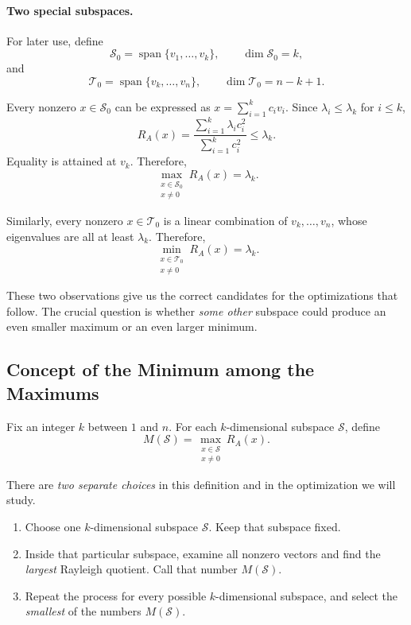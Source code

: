 \documentclass[14pt,letterpaper]{article}
\theoremstyle{plain}
\theoremstyle{definition}
\theoremstyle{remark}
\DeclareMathOperator{\Span}{span}
\begin{document}
\paragraph{Two special subspaces.}
For later use, define
\[
\mathcal S_0=\Span\{v_1,\ldots,v_k\},
\qquad \dim\mathcal S_0=k,
\]
and
\[
\mathcal T_0=\Span\{v_k,\ldots,v_n\},
\qquad \dim\mathcal T_0=n-k+1.
\]

Every nonzero $x\in\mathcal S_0$ can be expressed as
$x=\sum_{i=1}^k c_i v_i$. Since $\lambda_i\leq\lambda_k$
for $i\leq k$,
\[
R_A(x)=\frac{\sum_{i=1}^k\lambda_i c_i^2}
             {\sum_{i=1}^k c_i^2}
\leq\lambda_k.
\]
Equality is attained at $v_k$. Therefore,
\[
\boxed{
\max_{\substack{x\in\mathcal S_0\\x\neq0}}R_A(x)
=\lambda_k.
}
\]

Similarly, every nonzero $x\in\mathcal T_0$ is a
linear combination of $v_k,\ldots,v_n$, whose
eigenvalues are all at least $\lambda_k$. Therefore,
\[
\boxed{
\min_{\substack{x\in\mathcal T_0\\x\neq0}}R_A(x)
=\lambda_k.
}
\]

These two observations give us the correct candidates
for the optimizations that follow. The crucial question
is whether \emph{some other} subspace could produce an
even smaller maximum or an even larger minimum.

\subsection{Concept of the Minimum among the Maximums}
\label{subsec:courant_nested}

Fix an integer $k$ between $1$ and $n$.
For each $k$-dimensional subspace $\mathcal S$, define
\[
\boxed{
M(\mathcal S)=
\max_{\substack{x\in\mathcal S\\x\neq0}}R_A(x).
}
\]

There are \emph{two separate choices} in this definition
and in the optimization we will study.

\begin{enumerate}[label=\textbf{Step \arabic*.},leftmargin=*]
\item Choose one $k$-dimensional subspace $\mathcal S$.
      Keep that subspace fixed.
\item Inside that particular subspace, examine all nonzero
      vectors and find the \emph{largest} Rayleigh quotient.
      Call that number $M(\mathcal S)$.
\item Repeat the process for every possible $k$-dimensional
      subspace, and select the \emph{smallest} of the numbers
      $M(\mathcal S)$.
\end{enumerate}
\end{document}
